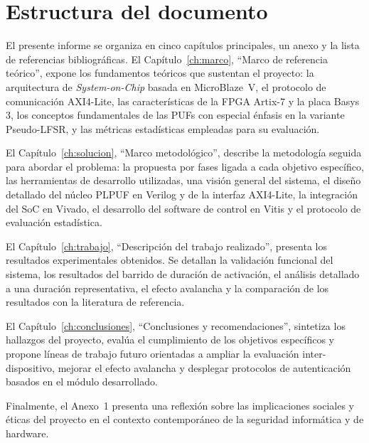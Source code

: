 \section{Estructura del documento}

El presente informe se organiza en cinco capítulos principales, un anexo y la
lista de referencias bibliográficas. El Capítulo~\ref{ch:marco}, ``Marco de
referencia teórico'', expone los fundamentos teóricos que sustentan el
proyecto: la arquitectura de \textit{System-on-Chip} basada en MicroBlaze~V,
el protocolo de comunicación AXI4-Lite, las características de la FPGA
Artix-7 y la placa Basys\,3, los conceptos fundamentales de las PUFs con
especial énfasis en la variante Pseudo-LFSR, y las métricas estadísticas
empleadas para su evaluación.

El Capítulo~\ref{ch:solucion}, ``Marco metodológico'', describe la
metodología seguida para abordar el problema: la propuesta por fases ligada a
cada objetivo específico, las herramientas de desarrollo utilizadas, una
visión general del sistema, el diseño detallado del núcleo PLPUF en Verilog
y de la interfaz AXI4-Lite, la integración del SoC en Vivado, el desarrollo
del software de control en Vitis y el protocolo de evaluación estadística.

El Capítulo~\ref{ch:trabajo}, ``Descripción del trabajo realizado'',
presenta los resultados experimentales obtenidos. Se detallan la validación
funcional del sistema, los resultados del barrido de duración de activación,
el análisis detallado a una duración representativa, el efecto avalancha y
la comparación de los resultados con la literatura de referencia.

El Capítulo~\ref{ch:conclusiones}, ``Conclusiones y recomendaciones'',
sintetiza los hallazgos del proyecto, evalúa el cumplimiento de los
objetivos específicos y propone líneas de trabajo futuro orientadas a
ampliar la evaluación inter-dispositivo, mejorar el efecto avalancha y
desplegar protocolos de autenticación basados en el módulo desarrollado.

Finalmente, el Anexo~1 presenta una reflexión sobre las implicaciones
sociales y éticas del proyecto en el contexto contemporáneo de la seguridad
informática y de hardware.

